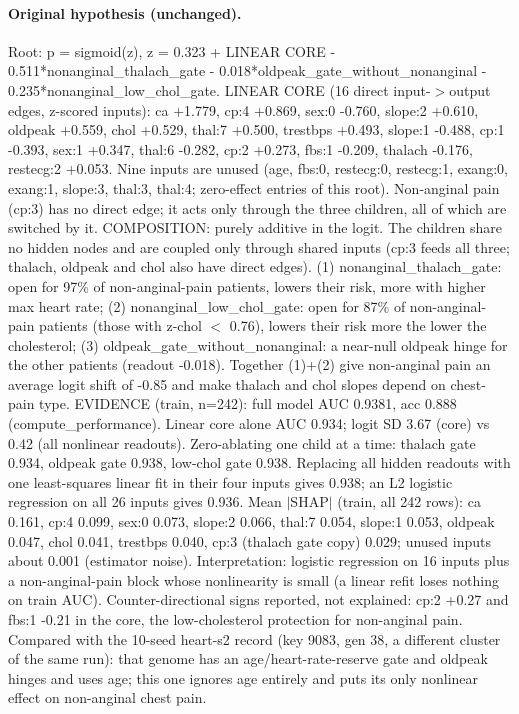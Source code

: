 \documentclass[a4paper,10pt]{article}
\newif\ifreviewmarks
\newcommand{\reviewrule}{\noindent{\color{BrickRed}\rule{\linewidth}{0.8pt}}}
\newenvironment{drafted}[1][]{%
  \ifreviewmarks\par\addvspace{\medskipamount}\reviewrule\par\nopagebreak
  \noindent{\color{BrickRed}\sffamily\footnotesize\textbf{Thesis Draft}\quad #1\hfill review}\par\nopagebreak\smallskip\fi}{%
  \ifreviewmarks\par\smallskip\noindent{\color{BrickRed}\sffamily\footnotesize end of thesis draft}\par\nopagebreak\reviewrule\par\medskip\fi}
\begin{document}
\begin{drafted}[plain-language layer: heart-s2-c3]
\paragraph{Original hypothesis (unchanged).} Root: p = sigmoid(z), z = 0.323 + LINEAR CORE - 0.511*\allowbreak{}nonanginal\_\allowbreak{}thalach\_\allowbreak{}gate - 0.018*\allowbreak{}oldpeak\_\allowbreak{}gate\_\allowbreak{}without\_\allowbreak{}nonanginal - 0.235*\allowbreak{}nonanginal\_\allowbreak{}low\_\allowbreak{}chol\_\allowbreak{}gate. LINEAR CORE (16 direct input-$>$output edges, z-scored inputs): ca +1.779, cp:4 +0.869, sex:0 -0.760, slope:2 +0.610, oldpeak +0.559, chol +0.529, thal:7 +0.500, trestbps +0.493, slope:1 -0.488, cp:1 -0.393, sex:1 +0.347, thal:6 -0.282, cp:2 +0.273, fbs:1 -0.209, thalach -0.176, restecg:2 +0.053. Nine inputs are unused (age, fbs:0, restecg:0, restecg:1, exang:0, exang:1, slope:3, thal:3, thal:4; zero-effect entries of this root). Non-anginal pain (cp:3) has no direct edge; it acts only through the three children, all of which are switched by it. COMPOSITION: purely additive in the logit. The children share no hidden nodes and are coupled only through shared inputs (cp:3 feeds all three; thalach, oldpeak and chol also have direct edges). (1) nonanginal\_\allowbreak{}thalach\_\allowbreak{}gate: open for 97\% of non-anginal-pain patients, lowers their risk, more with higher max heart rate; (2) nonanginal\_\allowbreak{}low\_\allowbreak{}chol\_\allowbreak{}gate: open for 87\% of non-anginal-pain patients (those with z-chol $<$ 0.76), lowers their risk more the lower the cholesterol; (3) oldpeak\_\allowbreak{}gate\_\allowbreak{}without\_\allowbreak{}nonanginal: a near-null oldpeak hinge for the other patients (readout -0.018). Together (1)+(2) give non-anginal pain an average logit shift of -0.85 and make thalach and chol slopes depend on chest-pain type. EVIDENCE (train, n=242): full model AUC 0.9381, acc 0.888 (compute\_\allowbreak{}performance)\allowbreak{}. Linear core alone AUC 0.934; logit SD 3.67 (core) vs 0.42 (all nonlinear readouts). Zero-ablating one child at a time: thalach gate 0.934, oldpeak gate 0.938, low-chol gate 0.938. Replacing all hidden readouts with one least-squares linear fit in their four inputs gives 0.938; an L2 logistic regression on all 26 inputs gives 0.936. Mean $|$SHAP$|$ (train, all 242 rows): ca 0.161, cp:4 0.099, sex:0 0.073, slope:2 0.066, thal:7 0.054, slope:1 0.053, oldpeak 0.047, chol 0.041, trestbps 0.040, cp:3 (thalach gate copy) 0.029; unused inputs about 0.001 (estimator noise). Interpretation: logistic regression on 16 inputs plus a non-anginal-pain block whose nonlinearity is small (a linear refit loses nothing on train AUC). Counter-directional signs reported, not explained: cp:2 +0.27 and fbs:1 -0.21 in the core, the low-cholesterol protection for non-anginal pain. Compared with the 10-seed heart-s2 record (key 9083, gen 38, a different cluster of the same run): that genome has an age/\allowbreak{}heart-rate-reserve gate and oldpeak hinges and uses age; this one ignores age entirely and puts its only nonlinear effect on non-anginal chest pain.

\end{drafted}
\end{document}
